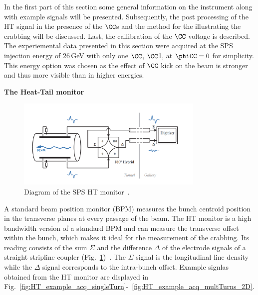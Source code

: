  In the first part of this section some general information on the instrument along with example signals will be presented. Subsequently, the post processing of the HT signal in the presence of the $\CC$s and the method for the illustrating the crabbing will be discussed. Last, the callibration of the $\CC$ voltage is described. The experiemental data presented in this section were acquired at the SPS injection energy of 26\,GeV with only one $\CC$, $\CC$1, at $\phiCC=0$ for simplicity. This energy option was chosen as the effect of $\CC$ kick on the beam is stronger and thus more visible than in higher energies.



\normalsize{\textbf{The Heat-Tail monitor}}\\
\begin{figure}[h]
   \centering         
   \includegraphics[width=0.8\textwidth]{images/Ch4/SPS_HT_monitor_diagram_modified.png}
       \caption{Diagram of the SPS HT monitor~\cite{Levens:2313358}.}
       \label{fig:SPS_HT_diagram}
\end{figure}
A standard beam position monitor (BPM) measures the bunch centroid position in the transverse planes at every passage of the beam. The HT monitor is a high bandwidth version of a standard BPM and can measure the transverse offset within the bunch, which makes it ideal for the measurement of the crabbing. Its reading consists of the sum $\Sigma$ and the  difference $\Delta$ of the electrode signals of a straight stripline coupler (Fig.~\ref{fig:SPS_HT_diagram})~\cite{Jones:987561, Levens:2313358}. The $\Sigma$ signal is the longitudinal line density while the $\Delta$ signal corresponds to the intra-bunch offset. Example signlas obtained from the HT monitor are displayed in Fig.~\ref{fig:HT_example_acq_singleTurn}-~\ref{fig:HT_example_acq_multTurns_2D}.


